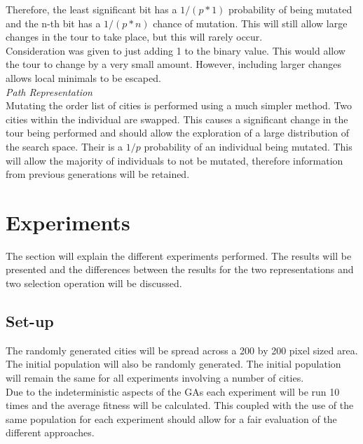 \documentclass[10pt,a4paper,openbib]{article}
\begin{document}
\begin{multicols}{2}
\noindent Therefore, the least significant bit has a $1/(p*1)$ probability of being mutated and the n-th bit has a $1/(p*n)$  chance of mutation. This will still allow large changes in the tour to take place, but this will rarely occur. \\

\noindent Consideration was given to just adding 1 to the binary value. This would allow the tour to change by a very small amount. However, including larger changes allows local minimals to be escaped. \\

\noindent \textit{Path Representation} \\

\noindent Mutating the order list of cities is performed using a much simpler method. Two cities within the individual are swapped. This causes a significant change in the tour being performed and should allow the exploration of a large distribution of the search space. Their is a $1/p$ probability of an individual being mutated. This will allow the majority of individuals to not be mutated, therefore information from previous generations will be retained.

\section{Experiments} \label{Experiments}

The section will explain the different experiments performed. The results will be presented and the differences between the results for the two representations and two selection operation will be discussed.


\subsection{Set-up}

\noindent The randomly generated cities will be spread across a 200 by 200 pixel sized area. The initial population will also be randomly generated. The initial population will remain the same for all experiments involving a number of cities. \\

\noindent Due to the indeterministic aspects of the GAs each experiment will be run 10 times and the average fitness will be calculated. This coupled with the use of the same population for each experiment should allow for a fair evaluation of the different approaches. \\



\end{multicols}
\end{document}
